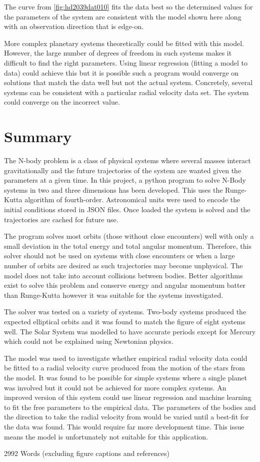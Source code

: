 \documentclass{physics_article_B}
\begin{document}
The curve from \cref{fig:hd2039dat010} fits the data best so the determined values for the parameters of the system \cite{noauthor_open_nodate-1} are consistent with the model shown here along with an observation direction that is edge-on.

More complex planetary systems theoretically could be fitted with this model. However, the large number of degrees of freedom in such systems makes it difficult to find the right parameters. Using linear regression (fitting a model to data) could achieve this but it is possible such a program would converge on solutions that match the data well but not the actual system. Concretely, several systems can be consistent with a particular radial velocity data set. The system could converge on the incorrect value.

\section{Summary}

The N-body problem is a class of physical systems where several masses interact gravitationally and the future trajectories of the system are wanted given the parameters at a given time. In this project, a python program to solve N-Body systems in two and three dimensions has been developed. This uses the Runge-Kutta algorithm of fourth-order. Astronomical units were used to encode the initial conditions stored in JSON files. Once loaded the system is solved and the trajectories are cached for future use.

The program solves most orbits (those without close encounters) well with only a small deviation in the total energy and total angular momentum. Therefore, this solver should not be used on systems with close encounters or when a large number of orbits are desired as such trajectories may become unphysical. The model does not take into account collisions between bodies. Better algorithms exist to solve this problem and conserve energy and angular momentum batter than Runge-Kutta however it was suitable for the systems investigated.

The solver was tested on a variety of systems. Two-body systems produced the expected elliptical orbits and it was found to match the figure of eight systems well. The Solar System was modelled to have accurate periods except for Mercury which could not be explained using Newtonian physics.

The model was used to investigate whether empirical radial velocity data could be fitted to a radial velocity curve produced from the motion of the stars from the model. It was found to be possible for simple systems where a single planet was involved but it could not be achieved for more complex systems. An improved version of this system could use linear regression and machine learning to fit the free parameters to the empirical data. The parameters of the bodies and the direction to take the radial velocity from would be varied until a best-fit for the data was found. This would require far more development time. This issue means the model is unfortunately not suitable for this application.

\newpage
\printbibliography

2992 Words (excluding figure captions and references)
\end{document}
